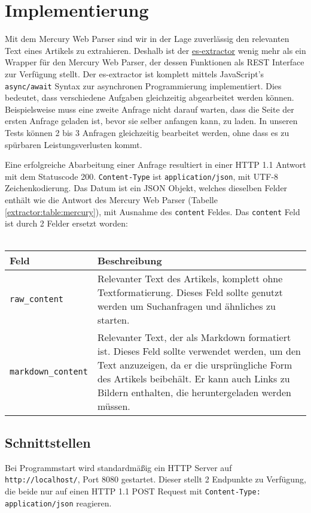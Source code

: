 \section{Implementierung} \label{extractor:sec:impl}
Mit dem Mercury Web Parser sind wir in der Lage zuverlässig den relevanten Text eines Artikels zu extrahieren.
Deshalb ist der \hyperref{https://github.com/elastifeed/es-extractor/}{}{}{es-extractor} wenig mehr als ein Wrapper für den Mercury Web Parser, der dessen Funktionen als REST Interface zur Verfügung stellt. Der es-extractor ist komplett mittels JavaScript's \texttt{async/await} Syntax zur asynchronen Programmierung implementiert. Dies bedeutet, dass verschiedene Aufgaben gleichzeitig abgearbeitet werden können. Beispielsweise muss eine zweite Anfrage nicht darauf warten, dass die Seite der ersten Anfrage geladen ist, bevor sie selber anfangen kann, zu laden. In unseren Tests können 2 bis 3 Anfragen gleichzeitig bearbeitet werden, ohne dass es zu spürbaren Leistungsverlusten kommt. \par
Eine erfolgreiche Abarbeitung einer Anfrage resultiert in einer HTTP 1.1 Antwort mit dem Statuscode 200. \verb|Content-Type| ist \verb|application/json|, mit UTF-8 Zeichenkodierung. Das Datum ist ein \ac{JSON} Objekt, welches dieselben Felder enthält wie die Antwort des Mercury Web Parser (Tabelle \ref{extractor:table:mercury}), mit Ausnahme des \verb|content| Feldes. Das \verb|content| Feld ist durch 2 Felder ersetzt worden: \\ \\
	\begin{tabu}{lX}
		\toprule
		Feld & Beschreibung \\ \midrule
		\texttt{raw\_content} & Relevanter Text des Artikels, komplett ohne Textformatierung. Dieses Feld sollte genutzt werden um Suchanfragen und ähnliches zu starten. \\
		\midrule
		\texttt{markdown\_content} & Relevanter Text, der als Markdown \cite{markdown2016} formatiert ist. Dieses Feld sollte verwendet werden, um den Text anzuzeigen, da er die ursprüngliche Form des Artikels beibehält. Er kann auch Links zu Bildern enthalten, die heruntergeladen werden müssen. \\
		\bottomrule
	\end{tabu}

\subsection{Schnittstellen}
Bei Programmstart wird standardmäßig ein HTTP Server auf \verb|http://localhost/|, Port 8080 gestartet. Dieser stellt 2 Endpunkte zu Verfügung, die beide nur auf einen HTTP 1.1 POST Request mit \verb|Content-Type: application/json| reagieren. 
